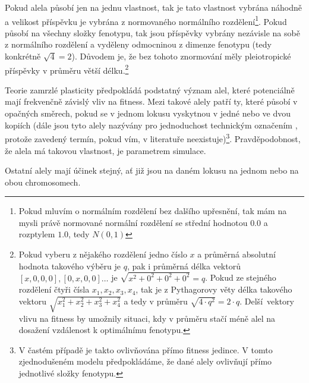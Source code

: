 Pokud alela působí jen na jednu vlastnost, tak je tato vlastnost vybrána náhodně a velikost příspěvku je vybrána z
normovaného normálního rozdělení\footnote{Pokud mluvím o normálním rozdělení bez dalšího upřesnění, tak mám na mysli
právě normované normální rozdělení se střední hodnotou $0.0$ a rozptylem $1.0$, tedy $N(0, 1)$}.
Pokud působí na všechny složky fenotypu, tak jsou příspěvky vybrány nezávisle na sobě z normálního
rozdělení a vyděleny odmocninou z dimenze fenotypu (tedy konkrétně $\sqrt{4} = 2$).
Důvodem je, že bez tohoto znormování měly pleiotropické příspěvky v průměru větší délku.\footnote{
    Pokud vyberu z nějakého rozdělení jedno číslo $x$ a průměrná absolutní hodnota takového výběru je $q$, pak i
    průměrná délka vektorů $[x, 0, 0, 0], [0, x, 0, 0]\ldots$ je $\sqrt{x^2 + 0^2+ 0^2+ 0^2} = q$.
    Pokud ze stejného rozdělení čtyři čísla $x_1, x_2, x_3, x_4$, tak je z Pythagorovy věty délka takového vektoru
    $\sqrt{x_1^2 + x_2^2+ x_3^2+ x_4^2}$ a tedy v průměru $\sqrt{4 \cdot q^2} = 2 \cdot q$. Delší vektory vlivu na
    fitness by umožnily situaci, kdy v průměru stačí méně alel na dosažení vzdálenost k optimálnímu fenotypu.
}

Teorie zamrzlé plasticity předpokládá podstatný význam alel, které potenciálně mají frekvenčně závislý vliv na fitness.
Mezi takové alely patří ty, které působí v opačných směrech, pokud se
v jednom lokusu vyskytnou v jedné nebo ve dvou kopiích (dále jsou tyto alely nazývány pro jednoduchost
technickým označením , protože zavedený termín, pokud vím, v literatuře neexistuje)\footnote{
V častém případě je takto ovlivňována přímo fitness jedince. V tomto zjednodušeném modelu předpokládáme, že dané alely
ovlivňují přímo jednotlivé složky fenotypu.
}. Pravděpodobnost, že alela má takovou vlastnost, je parametrem simulace.

Ostatní alely mají účinek stejný, ať již jsou na daném lokusu na jednom nebo na obou chromosomech.

